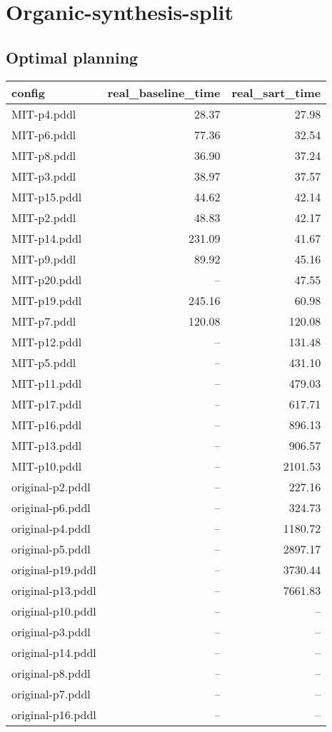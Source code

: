\documentclass{article}
\begin{document}
                \newpage \section{Organic-synthesis-split}
                    \subsection*{Optimal planning}
                    
                            \begin{center}
                            \scriptsize
                            \begin{tabular}{@{}l|r|r@{}}
                            config & real\_baseline\_time & real\_sart\_time\\\midrule
                             MIT-p4.pddl&28.37&27.98\\
 MIT-p6.pddl&77.36&32.54\\
 MIT-p8.pddl&36.90&37.24\\
 MIT-p3.pddl&38.97&37.57\\
 MIT-p15.pddl&44.62&42.14\\
 MIT-p2.pddl&48.83&42.17\\
 MIT-p14.pddl&231.09&41.67\\
 MIT-p9.pddl&89.92&45.16\\
 MIT-p20.pddl&--&47.55\\
 MIT-p19.pddl&245.16&60.98\\
 MIT-p7.pddl&120.08&120.08\\
 MIT-p12.pddl&--&131.48\\
 MIT-p5.pddl&--&431.10\\
 MIT-p11.pddl&--&479.03\\
 MIT-p17.pddl&--&617.71\\
 MIT-p16.pddl&--&896.13\\
 MIT-p13.pddl&--&906.57\\
 MIT-p10.pddl&--&2101.53\\
 original-p2.pddl&--&227.16\\
 original-p6.pddl&--&324.73\\
 original-p4.pddl&--&1180.72\\
 original-p5.pddl&--&2897.17\\
 original-p19.pddl&--&3730.44\\
 original-p13.pddl&--&7661.83\\
 original-p10.pddl&--&--\\
 original-p3.pddl&--&--\\
 original-p14.pddl&--&--\\
 original-p8.pddl&--&--\\
 original-p7.pddl&--&--\\
 original-p16.pddl&--&--
                            \end{tabular}
                            \end{center}
                    
\end{document}
